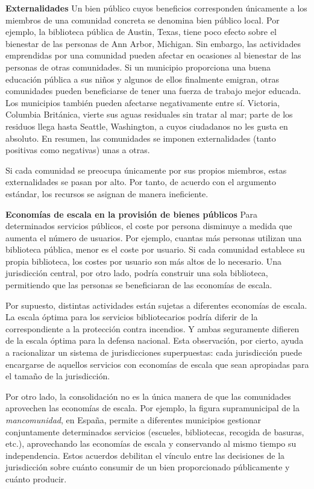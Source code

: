 \documentclass[10pt,a4paper]{article}
\begin{document}
\textbf{Externalidades}
Un bien público cuyos beneficios corresponden únicamente a los miembros de una comunidad concreta se denomina bien público local. Por ejemplo, la biblioteca pública de Austin, Texas, tiene poco efecto sobre el bienestar de las personas de Ann Arbor, Michigan. Sin embargo, las actividades emprendidas por una comunidad pueden afectar en ocasiones al bienestar de las personas de otras comunidades. Si un municipio proporciona una buena educación pública a sus niños y algunos de ellos finalmente emigran, otras comunidades pueden beneficiarse de tener una fuerza de trabajo mejor educada. Los municipios también pueden afectarse negativamente entre sí. Victoria, Columbia Británica, vierte sus aguas residuales sin tratar al mar; parte de los residuos llega hasta Seattle, Washington, a cuyos ciudadanos no les gusta en absoluto. En resumen, las comunidades se imponen externalidades (tanto positivas como negativas) unas a otras.

Si cada comunidad se preocupa únicamente por sus propios miembros, estas externalidades se pasan por alto. Por tanto, de acuerdo con el argumento estándar, los recursos se asignan de manera ineficiente.

\textbf{Economías de escala en la provisión de bienes públicos}
Para determinados servicios públicos, el coste por persona disminuye a medida que aumenta el número de usuarios. Por ejemplo, cuantas más personas utilizan una biblioteca pública, menor es el coste por usuario. Si cada comunidad establece su propia biblioteca, los costes por usuario son más altos de lo necesario. Una jurisdicción central, por otro lado, podría construir una sola biblioteca, permitiendo que las personas se beneficiaran de las economías de escala.

Por supuesto, distintas actividades están sujetas a diferentes economías de escala. La escala óptima para los servicios bibliotecarios podría diferir de la correspondiente a la protección contra incendios. Y ambas seguramente difieren de la escala óptima para la defensa nacional. Esta observación, por cierto, ayuda a racionalizar un sistema de jurisdicciones superpuestas: cada jurisdicción puede encargarse de aquellos servicios con economías de escala que sean apropiadas para el tamaño de la jurisdicción.

Por otro lado, la consolidación no es la única manera de que las comunidades aprovechen las economías de escala. Por ejemplo, la figura supramunicipal de la \textit{mancomunidad}, en España, permite a diferentes municipios gestionar conjuntamente determinados servicios (escueles, bibliotecas, recogida de basuras, etc.), aprovechando las economías de escala y conservando al mismo tiempo su independencia. Estos acuerdos debilitan el vínculo entre las decisiones de la jurisdicción sobre cuánto consumir de un bien proporcionado públicamente y cuánto producir.
\end{document}
